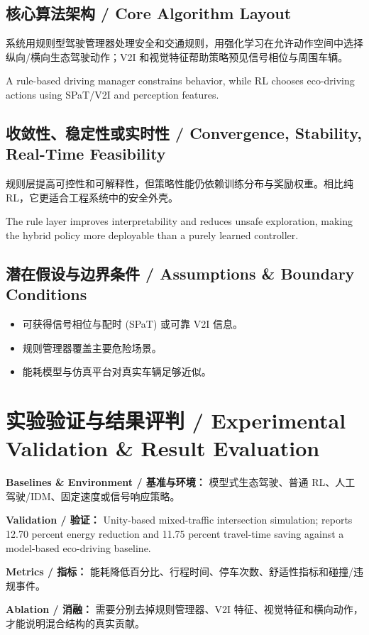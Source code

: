 \documentclass[UTF8,a4paper,11pt,fontset=fandol]{ctexart}
\begin{document}
\subsection{核心算法架构 / Core Algorithm Layout}
系统用规则型驾驶管理器处理安全和交通规则，用强化学习在允许动作空间中选择纵向/横向生态驾驶动作；V2I 和视觉特征帮助策略预见信号相位与周围车辆。

A rule-based driving manager constrains behavior, while RL chooses eco-driving actions using SPaT/V2I and perception features.

\subsection{收敛性、稳定性或实时性 / Convergence, Stability, Real-Time Feasibility}
规则层提高可控性和可解释性，但策略性能仍依赖训练分布与奖励权重。相比纯 RL，它更适合工程系统中的安全外壳。

The rule layer improves interpretability and reduces unsafe exploration, making the hybrid policy more deployable than a purely learned controller.

\subsection{潜在假设与边界条件 / Assumptions \& Boundary Conditions}
\begin{itemize}
\item 可获得信号相位与配时 (SPaT) 或可靠 V2I 信息。
\item 规则管理器覆盖主要危险场景。
\item 能耗模型与仿真平台对真实车辆足够近似。
\end{itemize}


\section{实验验证与结果评判 / Experimental Validation \& Result Evaluation}
\textbf{Baselines \& Environment / 基准与环境：} 模型式生态驾驶、普通 RL、人工驾驶/IDM、固定速度或信号响应策略。

\textbf{Validation / 验证：} Unity-based mixed-traffic intersection simulation; reports 12.70 percent energy reduction and 11.75 percent travel-time saving against a model-based eco-driving baseline.

\textbf{Metrics / 指标：} 能耗降低百分比、行程时间、停车次数、舒适性指标和碰撞/违规事件。

\textbf{Ablation / 消融：} 需要分别去掉规则管理器、V2I 特征、视觉特征和横向动作，才能说明混合结构的真实贡献。
\end{document}
